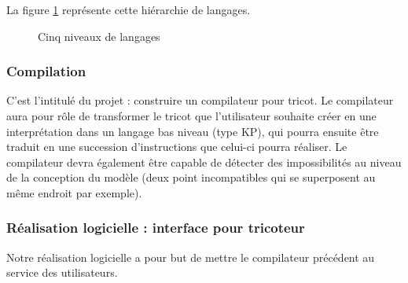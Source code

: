 \documentclass{article}
\begin{document}
La figure \ref{nvx-lg} représente cette hiérarchie de langages.

    \begin{figure}[!h]
    \centering


    \caption{Cinq niveaux de langages}
    \label{nvx-lg}
    \end{figure}


\subsubsection{Compilation}

C'est l'intitulé du projet : construire un compilateur pour tricot. Le compilateur aura pour rôle de transformer le tricot que
l'utilisateur souhaite créer en une interprétation dans un langage bas niveau (type KP), qui pourra ensuite être traduit en une succession
d'instructions que celui-ci pourra réaliser.
Le compilateur devra également être capable de détecter des impossibilités au niveau de la conception du modèle (deux point incompatibles qui se superposent au même endroit par exemple).


\subsubsection{Réalisation logicielle : interface pour tricoteur}

Notre réalisation logicielle a pour but de mettre le compilateur précédent au service des utilisateurs.
\end{document}
